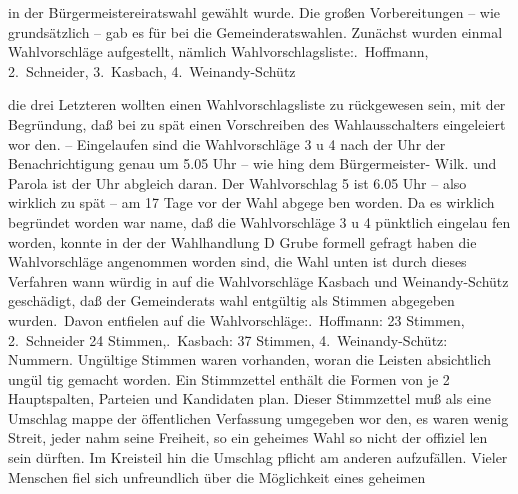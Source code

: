 

in der Bürgermeistereiratswahl gewählt wurde.\ob
Die großen Vorbereitungen – wie grundsätzlich – gab es für\ob
bei die Gemeinderatswahlen. Zunächst wurden einmal Wahlvorschläge aufgestellt, nämlich Wahlvorschlagsliste:.\ Hoffmann,  2.\ Schneider,  3.\ Kasbach,  4.\ Weinandy-Schütz

\pend
{}
\pstart

die drei Letzteren wollten einen Wahlvorschlagsliste zu\ohb
rückgewesen sein, mit der Begründung, daß bei zu spät\ohb
einen Vorschreiben des Wahlausschalters eingeleiert wor\ohb
den. – Eingelaufen sind die Wahlvorschläge 3 u 4 nach\ob
der Uhr der Benachrichtigung genau um 5.05 Uhr – wie\ohb
hing dem Bürgermeister- Wilk. und Parola ist der Uhr\ohb
abgleich daran. Der Wahlvorschlag 5 ist 6.05 Uhr – also\ob
wirklich zu spät – am 17 Tage vor der Wahl abgege\ohb
ben worden. Da es wirklich begründet worden war\ohb
name, daß die Wahlvorschläge 3 u 4 pünktlich eingelau\ohb
fen worden, konnte in der der Wahlhandlung D\ohb
Grube formell gefragt haben die Wahlvorschläge angenommen\ob
worden sind, die Wahl unten\unsicher{} ist durch dieses Verfahren\ob
wann würdig in auf die Wahlvorschläge Kasbach\ob
und Weinandy-Schütz geschädigt, daß der Gemeinderats\ohb
wahl entgültig als Stimmen abgegeben wurden.\ Davon entfielen auf die Wahlvorschläge:.\ Hoffmann: 23 Stimmen, 2.\ Schneider 24 Stimmen,.\ Kasbach:  37 Stimmen, 4.\ Weinandy-Schütz: Nummern. Ungültige Stimmen waren vorhanden, woran die Leisten absichtlich ungül\ohb
tig gemacht worden. Ein Stimmzettel enthält die\ob
Formen von je 2 Hauptspalten, Parteien und Kandidaten\ohb
plan. Dieser Stimmzettel muß als eine Umschlag\ohb
mappe der öffentlichen Verfassung umgegeben wor\ohb
den, es waren wenig Streit, jeder nahm seine\ob
Freiheit, so ein geheimes Wahl so nicht der offiziel\ohb
len sein dürften. Im Kreisteil hin die Umschlag\ohb
pflicht am anderen aufzufällen. Vieler Menschen\unsicher\ob
fiel sich unfreundlich über die Möglichkeit eines geheimen
\pend
